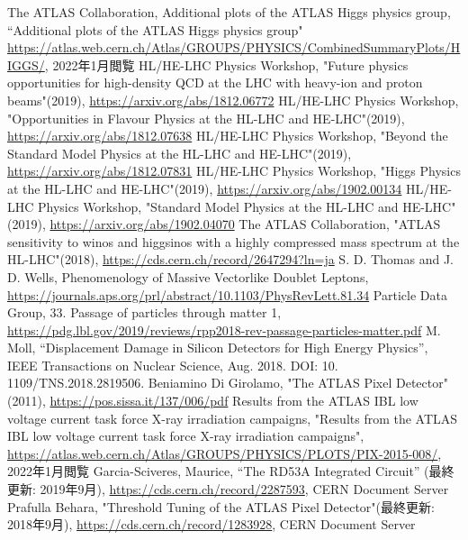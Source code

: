 \begin{thebibliography}{24}
The ATLAS Collaboration, Additional plots of the ATLAS Higgs physics group, “Additional plots of the ATLAS Higgs physics group" \url{https://atlas.web.cern.ch/Atlas/GROUPS/PHYSICS/CombinedSummaryPlots/HIGGS/}, 2022年1月閲覧
HL/HE-LHC Physics Workshop, "Future physics opportunities for high-density QCD at the LHC with heavy-ion and proton beams"(2019), \url{https://arxiv.org/abs/1812.06772}
HL/HE-LHC Physics Workshop, "Opportunities in Flavour Physics at the HL-LHC and HE-LHC"(2019), \url{https://arxiv.org/abs/1812.07638}
HL/HE-LHC Physics Workshop, "Beyond the Standard Model Physics at the HL-LHC and HE-LHC"(2019), \url{https://arxiv.org/abs/1812.07831}
HL/HE-LHC Physics Workshop, "Higgs Physics at the HL-LHC and HE-LHC"(2019), \url{https://arxiv.org/abs/1902.00134}
HL/HE-LHC Physics Workshop, "Standard Model Physics at the HL-LHC and HE-LHC"(2019), \url{https://arxiv.org/abs/1902.04070}
The ATLAS Collaboration, "ATLAS sensitivity to winos and higgsinos with a highly compressed mass spectrum at the HL-LHC"(2018), \url{https://cds.cern.ch/record/2647294?ln=ja}
S. D. Thomas and J. D. Wells, Phenomenology of Massive Vectorlike Doublet Leptons, \url{https://journals.aps.org/prl/abstract/10.1103/PhysRevLett.81.34}
Particle Data Group, 33. Passage of particles through matter 1,
\url{https://pdg.lbl.gov/2019/reviews/rpp2018-rev-passage-particles-matter.pdf}
M. Moll, “Displacement Damage in Silicon Detectors for High Energy Physics”, IEEE Transactions on Nuclear Science, Aug. 2018. DOI: 10. 1109/TNS.2018.2819506.
Beniamino Di Girolamo, "The ATLAS Pixel Detector" (2011), \url{https://pos.sissa.it/137/006/pdf}
Results from the ATLAS IBL low voltage current task force X-ray irradiation campaigns, "Results from the ATLAS IBL low voltage current task force X-ray irradiation campaigns", \url{https://atlas.web.cern.ch/Atlas/GROUPS/PHYSICS/PLOTS/PIX-2015-008/}, 2022年1月閲覧
Garcia-Sciveres, Maurice, “The RD53A Integrated Circuit” (最終更新: 2019年9月), \url{https://cds.cern.ch/record/2287593}, CERN Document Server
Prafulla Behara, "Threshold Tuning of the ATLAS Pixel Detector"(最終更新: 2018年9月), \url{https://cds.cern.ch/record/1283928}, CERN Document Server

\end{thebibliography}
